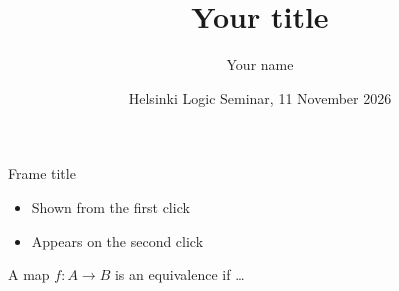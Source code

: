 \documentclass[aspectratio=169,11pt]{beamer}
\title{Your title}
\author{Your name}
\date{Helsinki Logic Seminar, 11 November 2026}
\begin{document}
\begin{frame}
  \titlepage
\end{frame}

\begin{frame}{Frame title}
  \begin{itemize}
    \item<1-> Shown from the first click
    \item<2-> Appears on the second click
  \end{itemize}

  \begin{definition}
    A map $f : A \to B$ is an equivalence if \ldots
  \end{definition}

\end{frame}
\end{document}
